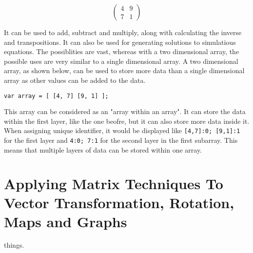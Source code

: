 \documentclass[a4paper,10pt]{article}
\begin{document}
      \begin{equation*}
        \begin{pmatrix}
          4 & 9\\
          7 & 1
        \end{pmatrix}
      \end{equation*}

      It can be used to add, subtract and multiply, along with calculating the inverse and transpositions. It can also be used for generating solutions to simulatious equations. The possiblities are vast, whereas with a two dimensional array, the possible uses are very similar to a single dimensional array. A two dimensional array, as shown below, can be used to store more data than a single dimensional array as other values can be added to the data.

      \texttt{var array = [ [4, 7] [9, 1] ];}

      This array can be considered as an "array within an array". It can store the data within the first layer, like the one beofre, but it can also store more data inside it. When assigning unique identifier, it would be displayed like \texttt{[4,7]:0; [9,1]:1} for the first layer and \texttt{4:0; 7:1} for the second layer in the first subarray. This means that multiple layers of data can be stored within one array.

    \newpage

    \section{Applying Matrix Techniques To Vector Transformation, Rotation, Maps and Graphs}
      things.
\end{document}
